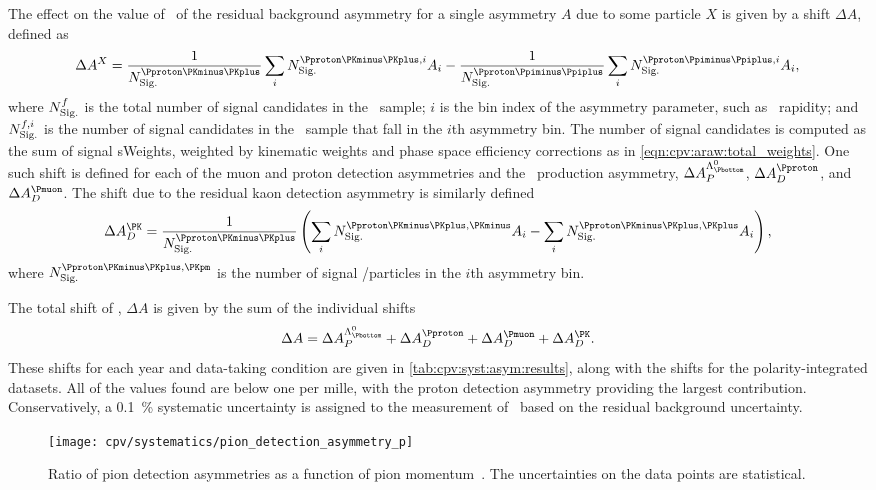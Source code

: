The effect on the value of \dACP\ of the residual background asymmetry for a 
single asymmetry $A$ due to some particle $X$ is given by a shift $\Delta{A}$, 
defined as
\begin{equation}
  \Delta{A}^{X} = \frac{1}{\nsig^{\pKK}}\sum_{i} \nsig^{\pKK,i} A_{i} -
    \frac{1}{\nsig^{\ppipi}}\sum_{i} \nsig^{\ppipi,i} A_{i},
\end{equation}
where $N_{\text{Sig.}}^{f}$ is the total number of signal candidates in the \LcTof\ sample; $i$ is the bin index of the asymmetry parameter, such as \PLambdab\ rapidity; and $N_{\text{Sig.}}^{f,i}$ is the number of signal candidates in the \LcTof\ sample that fall in the $i$th asymmetry bin.
The number of signal candidates is computed as the sum of signal sWeights, weighted by kinematic weights and phase space efficiency corrections as in \cref{eqn:cpv:araw:total_weights}.
One such shift is defined for each of the muon and proton detection asymmetries 
and the \PLambdab\ production asymmetry, $\Delta\APLb$, $\Delta\ADp$, and 
$\Delta\ADmu$.
The shift due to the residual kaon detection asymmetry is similarly defined
\begin{equation}
  \Delta{\ADK} = \frac{1}{\nsig^{\pKK}}\left(%
    \sum_{i} \nsig^{\pKK,\PKminus} A_{i} -
    \sum_{i} \nsig^{\pKK,\PKplus} A_{i}
  \right),
\end{equation}
where $\nsig^{\pKK,\PKpm}$ is the number of signal \PKplus/\PKminus particles in the $i$th asymmetry bin.

The total shift of \dACP, $\Delta{A}$ is given by the sum of the individual shifts
\begin{equation}
  \Delta{A} = \Delta\APLb + \Delta\ADp + \Delta\ADmu + \Delta\ADK.
\end{equation}
These shifts for each year and data-taking condition are given in \cref{tab:cpv:syst:asym:results}, along with the shifts for the polarity-integrated datasets.
All of the values found are below one per mille, with the proton detection asymmetry providing the largest contribution.
Conservatively, a \SI{0.1}{\percent} systematic uncertainty is assigned to the measurement of \dACP\ based on the residual background uncertainty.

\begin{figure}
  \centering
  \texttt{[image: cpv/systematics/pion\_detection\_asymmetry\_p]}
  \caption{%
    Ratio of pion detection asymmetries as a function of pion 
    momentum~\cite{Aaij:2012cy}.
    The uncertainties on the data points are statistical.
  }
  \label{fig:cpv:syst:asym:pion}
\end{figure}


